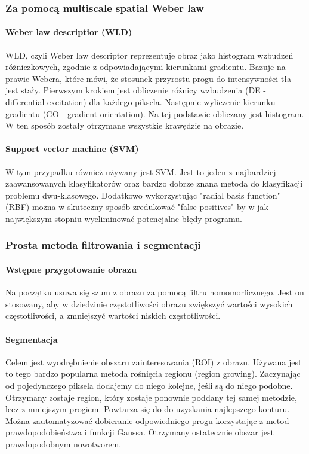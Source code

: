 \documentclass[11pt,openany]{sprawozdanie-agh}
\begin{document}
\subsubsection{Za pomocą multiscale spatial Weber law}
\paragraph{Weber law descriptior (WLD)\\}
WLD, czyli Weber law descriptor reprezentuje obraz jako histogram wzbudzeń różniczkowych, zgodnie z odpowiadającymi kierunkami gradientu. Bazuje na prawie Webera, które mówi, że stosunek przyrostu progu do intensywności tła jest stały. Pierwszym krokiem jest obliczenie różnicy wzbudzenia (DE - differential excitation) dla każdego piksela. Następnie wyliczenie kierunku gradientu (GO - gradient orientation). Na tej podstawie obliczany jest histogram. W ten sposób zostały otrzymane wszystkie krawędzie na obrazie.

\paragraph{Support vector machine (SVM)\\}
W tym przypadku również używany jest SVM. Jest to jeden z najbardziej zaawansowanych klasyfikatorów oraz bardzo dobrze znana metoda do klasyfikacji problemu dwu-klasowego. Dodatkowo wykorzystując "radial basis function" (RBF) można w skuteczny sposób zredukować "false-positives" by w jak największym stopniu wyeliminować potencjalne błędy programu.

\subsubsection{Prosta metoda filtrowania i segmentacji}
\paragraph{Wstępne przygotowanie obrazu\\}
Na początku usuwa się szum z obrazu za pomocą filtru homomorficznego. Jest on stosowany, aby w dziedzinie częstotliwości obrazu zwiększyć wartości wysokich częstotliwości, a zmniejszyć wartości niskich częstotliwości.

\paragraph{Segmentacja\\}
Celem jest wyodrębnienie obszaru zainteresowania (ROI) z obrazu. Używana jest to tego bardzo popularna metoda rośnięcia regionu (region growing). Zaczynając od pojedynczego piksela dodajemy do niego kolejne, jeśli są do niego podobne. Otrzymany zostaje region, który zostaje ponownie poddany tej samej metodzie, lecz z mniejszym progiem. Powtarza się do do uzyskania najlepszego konturu. Można zautomatyzować dobieranie odpowiedniego progu korzystając z metod prawdopodobieństwa i funkcji Gaussa. Otrzymany ostatecznie obszar jest prawdopodobnym nowotworem.
\end{document}

